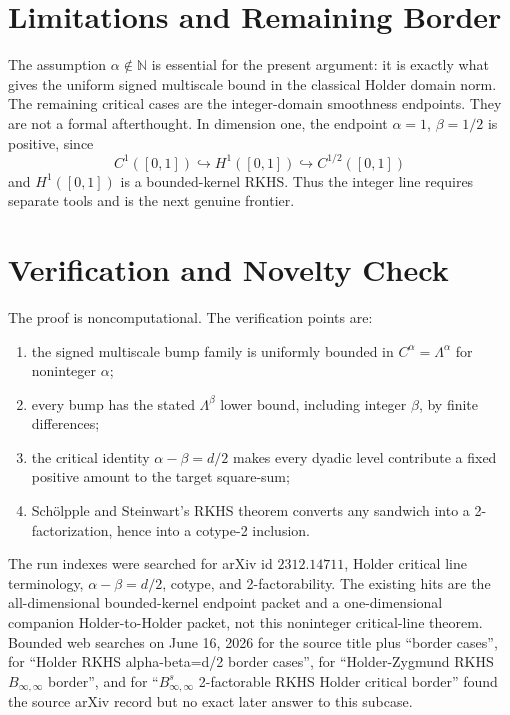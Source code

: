 \documentclass[11pt]{article}
\newcommand{\N}{\mathbb{N}}
\newcommand{\Lam}{\Lambda}
\begin{document}
\section*{Limitations and Remaining Border}

The assumption \(\alpha\notin\N\) is essential for the present argument: it
is exactly what gives the uniform signed multiscale bound in the classical
Holder domain norm. The remaining critical cases are the integer-domain
smoothness endpoints. They are not a formal afterthought. In dimension one,
the endpoint \(\alpha=1\), \(\beta=1/2\) is positive, since
\[
  C^1([0,1])\hookrightarrow H^1([0,1])
  \hookrightarrow C^{1/2}([0,1])
\]
and \(H^1([0,1])\) is a bounded-kernel RKHS. Thus the integer line requires
separate tools and is the next genuine frontier.

\section*{Verification and Novelty Check}

The proof is noncomputational. The verification points are:
\begin{enumerate}
\item the signed multiscale bump family is uniformly bounded in
      \(C^\alpha=\Lam^\alpha\) for noninteger \(\alpha\);
\item every bump has the stated \(\Lam^\beta\) lower bound, including integer
      \(\beta\), by finite differences;
\item the critical identity \(\alpha-\beta=d/2\) makes every dyadic level
      contribute a fixed positive amount to the target square-sum;
\item Sch\"olpple and Steinwart's RKHS theorem converts any sandwich into a
      2-factorization, hence into a cotype-2 inclusion.
\end{enumerate}

The run indexes were searched for arXiv id \(2312.14711\), Holder critical
line terminology, \(\alpha-\beta=d/2\), cotype, and 2-factorability. The
existing hits are the all-dimensional bounded-kernel endpoint packet and a
one-dimensional companion Holder-to-Holder packet, not this noninteger
critical-line theorem. Bounded web searches on June 16, 2026 for the source
title plus ``border cases'', for ``Holder RKHS alpha-beta=d/2 border cases'',
for ``Holder-Zygmund RKHS \(B_{\infty,\infty}\) border'', and for
``\(B^s_{\infty,\infty}\) 2-factorable RKHS Holder critical border'' found
the source arXiv record but no exact later answer to this subcase.
\end{document}
